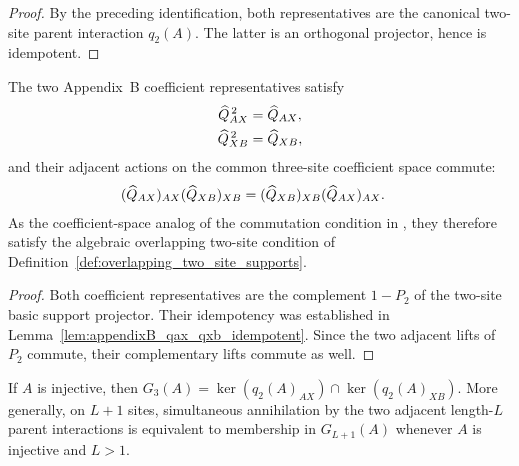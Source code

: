 \begin{proof}
    \leanok
    By the preceding identification, both representatives are the canonical
    two-site parent interaction $q_2(A)$. The latter is an orthogonal
    projector, hence is idempotent.
\end{proof}

\begin{lemma}
    \label{thm:appendixB_overlapping_two_site_commutation}
    \leanok
    The two Appendix~B coefficient representatives satisfy
    \begin{align}
        \widehat Q_{AX}^{\,2}
         & =\widehat Q_{AX},
        \notag               \\
        \widehat Q_{XB}^{\,2}
         & =\widehat Q_{XB},
        \notag
    \end{align}
    and their adjacent actions on the common three-site coefficient space
    commute:
    \begin{align}
        (\widehat Q_{AX})_{AX}(\widehat Q_{XB})_{XB}
         & =
        (\widehat Q_{XB})_{XB}(\widehat Q_{AX})_{AX}.
        \notag
    \end{align}
    As the coefficient-space analog of the commutation condition in
    \cite[Definition~D.2]{Cirac2016MPDO_arXiv}, they therefore satisfy the
    algebraic overlapping two-site condition of
    Definition~\ref{def:overlapping_two_site_supports}.
\end{lemma}

\begin{proof}
    \leanok
    Both coefficient representatives are the complement $1-P_2$ of the
    two-site basic support projector. Their idempotency was established in
    Lemma~\ref{lem:appendixB_qax_qxb_idempotent}. Since the two adjacent lifts
    of $P_2$ commute, their complementary lifts commute as well.
\end{proof}

\begin{lemma}
    \label{thm:three_site_ground_space_adjacent_parent_kernels}
    \leanok
    If $A$ is injective, then
    $G_3(A) = \ker(q_2(A)_{AX}) \cap \ker(q_2(A)_{XB})$.
    More generally, on $L+1$ sites, simultaneous annihilation by the two
    adjacent length-$L$ parent interactions is equivalent to membership in
    $G_{L+1}(A)$ whenever $A$ is injective and $L>1$.
\end{lemma}

